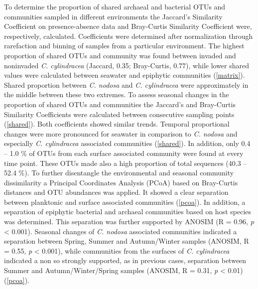 \documentclass[12pt,]{article}
\begin{document}
To determine the proportion of shared archaeal and bacterial OTUs and
communities sampled in different environments the Jaccard's Similarity
Coefficient on presence-absence data and Bray-Curtis Similarity
Coefficient were, respectively, calculated. Coefficients were determined
after normalization through rarefaction and binning of samples from a
particular environment. The highest proportion of shared OTUs and
community was found between invaded and noninvaded \emph{C. cylindracea}
(Jaccard, 0.35; Bray-Curtis, 0.77), while lower shared values were
calculated between seawater and epiphytic communities
(\autoref{matrix}). Shared proportion between \emph{C. nodosa} and
\emph{C. cylindracea} were approximately in the middle between these two
extremes. To assess seasonal changes in the proportion of shared OTUs
and communities the Jaccard's and Bray-Curtis Similarity Coefficients
were calculated between consecutive sampling points (\autoref{shared}).
Both coefficients showed similar trends. Temporal proportional changes
were more pronounced for seawater in comparison to \emph{C. nodosa} and
especially \emph{C. cylindracea} associated communities
(\autoref{shared}). In addition, only 0.4 -- 1.0 \si{\percent} of OTUs
from each surface associated community were found at every time point.
These OTUs made also a high proportion of total sequences (40.3 -- 52.4
\si{\percent}). To further disentangle the environmental and seasonal
community dissimilarity a Principal Coordinates Analysis (PCoA) based on
Bray-Curtis distances and OTU abundances was applied. It showed a clear
separation between planktonic and surface associated communities
(\autoref{pcoa}). In addition, a separation of epiphytic bacterial and
archaeal communities based on host species was determined. This
separation was further supported by ANOSIM (R = 0.96, \emph{p}
\textless{} 0.001). Seasonal changes of \emph{C. nodosa} associated
communities indicated a separation between Spring, Summer and
Autumn/Winter samples (ANOSIM, R = 0.55, \emph{p} \textless{} 0.001),
while communities from the surfaces of \emph{C. cylindracea} indicated a
non so strongly supported, as in previous cases, separation between
Summer and Autumn/Winter/Spring samples (ANOSIM, R = 0.31, \emph{p}
\textless{} 0.01) (\autoref{pcoa}).
\end{document}
